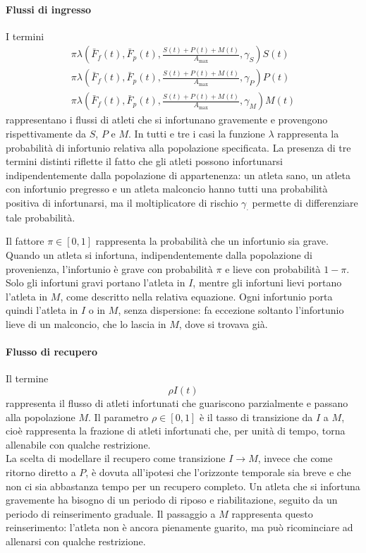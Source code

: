 \paragraph{Flussi di ingresso}
I termini
\begin{gather*}
    \pi \lambda\left(\bar{F}_f(t), \bar{F}_p(t), \frac{S(t) + P(t) + M(t)}{A_{\max}}, \gamma_S\right) S(t) \\
    \pi \lambda\left(\bar{F}_f(t), \bar{F}_p(t), \frac{S(t) + P(t) + M(t)}{A_{\max}}, \gamma_P\right) P(t) \\
    \pi \lambda\left(\bar{F}_f(t), \bar{F}_p(t), \frac{S(t) + P(t) + M(t)}{A_{\max}}, \gamma_M\right) M(t)
\end{gather*}
rappresentano i flussi di atleti che si infortunano gravemente e provengono rispettivamente da $S$, $P$ e $M$. In tutti e tre i casi la funzione $\lambda$ rappresenta la probabilità di infortunio relativa alla popolazione specificata. La presenza di tre termini distinti riflette il fatto che gli atleti possono infortunarsi indipendentemente dalla popolazione di appartenenza: un atleta sano, un atleta con infortunio pregresso e un atleta malconcio hanno tutti una probabilità positiva di infortunarsi, ma il moltiplicatore di rischio $\gamma_\cdot$ permette di differenziare tale probabilità. \par

Il fattore $\pi \in [0,1]$ rappresenta la probabilità che un infortunio sia grave. Quando un atleta si infortuna, indipendentemente dalla popolazione di provenienza, l'infortunio è grave con probabilità $\pi$ e lieve con probabilità $1-\pi$. Solo gli infortuni gravi portano l'atleta in $I$, mentre gli infortuni lievi portano l'atleta in $M$, come descritto nella relativa equazione. Ogni infortunio porta quindi l'atleta in $I$ o in $M$, senza dispersione: fa eccezione soltanto l'infortunio lieve di un malconcio, che lo lascia in $M$, dove si trovava già.

\paragraph{Flusso di recupero}
Il termine
\[
    \rho I(t)
\]
rappresenta il flusso di atleti infortunati che guariscono parzialmente e passano alla popolazione $M$. Il parametro $\rho \in [0,1]$ è il tasso di transizione da $I$ a $M$, cioè rappresenta la frazione di atleti infortunati che, per unità di tempo, torna allenabile con qualche restrizione. \\
La scelta di modellare il recupero come transizione $I \to M$, invece che come ritorno diretto a $P$, è dovuta all'ipotesi che l'orizzonte temporale sia breve e che non ci sia abbastanza tempo per un recupero completo. Un atleta che si infortuna gravemente ha bisogno di un periodo di riposo e riabilitazione, seguito da un periodo di reinserimento graduale. Il passaggio a $M$ rappresenta questo reinserimento: l'atleta non è ancora pienamente guarito, ma può ricominciare ad allenarsi con qualche restrizione.

